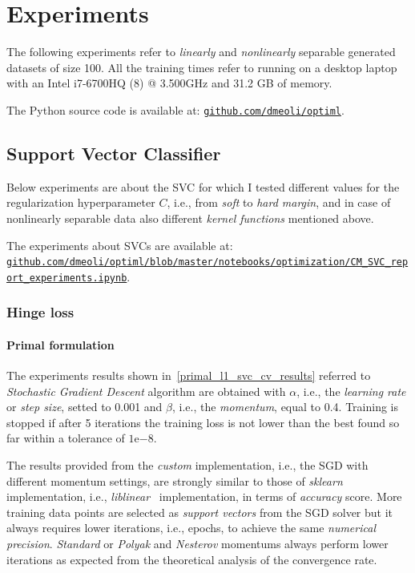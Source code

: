 \section{Experiments}

The following experiments refer to \emph{linearly} and \emph{nonlinearly} separable generated datasets of size 100. All the training times refer to running on a desktop laptop with an Intel i7-6700HQ (8) @ 3.500GHz and 31.2 GB of memory.

The Python source code is available at: \href{https://github.com/dmeoli/optiml}{\texttt{github.com/dmeoli/optiml}}.

\subsection{Support Vector Classifier}

Below experiments are about the SVC for which I tested different values for the regularization hyperparameter $C$, i.e., from \emph{soft} to \emph{hard margin}, and in case of nonlinearly separable data also different \emph{kernel functions} mentioned above.

The experiments about SVCs are available at: \\ \href{https://github.com/dmeoli/optiml/blob/master/notebooks/optimization/CM_SVC_report_experiments.ipynb}{\texttt{github.com/dmeoli/optiml/blob/master/notebooks/optimization/CM\_SVC\_report\_experiments.ipynb}}.

\subsubsection{Hinge loss}

\paragraph{Primal formulation}

The experiments results shown in~\ref{primal_l1_svc_cv_results} referred to \emph{Stochastic Gradient Descent} algorithm are obtained with $\alpha$, i.e., the \emph{learning rate} or \emph{step size}, setted to 0.001 and $\beta$, i.e., the \emph{momentum}, equal to 0.4. Training is stopped if after 5 iterations the training loss is not lower than the best found so far within a tolerance of $1\mathrm{e}{-8}$.



The results provided from the \emph{custom} implementation, i.e., the SGD with different momentum settings, are strongly similar to those of \emph{sklearn} implementation, i.e., \emph{liblinear}~\cite{fan2008liblinear} implementation, in terms of \emph{accuracy} score. More training data points are selected as \emph{support vectors} from the SGD solver but it always requires lower iterations, i.e., epochs, to achieve the same \emph{numerical precision}. \emph{Standard} or \emph{Polyak} and \emph{Nesterov} momentums always perform lower iterations as expected from the theoretical analysis of the convergence rate.

